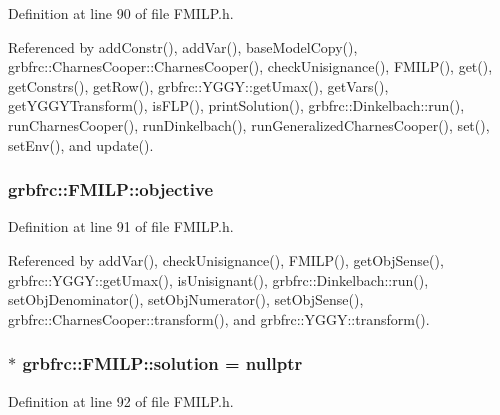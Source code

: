 Definition at line 90 of file F\+M\+I\+L\+P.\+h.



Referenced by add\+Constr(), add\+Var(), base\+Model\+Copy(), grbfrc\+::\+Charnes\+Cooper\+::\+Charnes\+Cooper(), check\+Unisignance(), F\+M\+I\+L\+P(), get(), get\+Constrs(), get\+Row(), grbfrc\+::\+Y\+G\+G\+Y\+::get\+Umax(), get\+Vars(), get\+Y\+G\+G\+Y\+Transform(), is\+F\+L\+P(), print\+Solution(), grbfrc\+::\+Dinkelbach\+::run(), run\+Charnes\+Cooper(), run\+Dinkelbach(), run\+Generalized\+Charnes\+Cooper(), set(), set\+Env(), and update().

\subsubsection[{\texorpdfstring{objective}{objective}}]{ grbfrc\+::\+F\+M\+I\+L\+P\+::objective\hspace{0.3cm}{\ttfamily [private]}}\hypertarget{classgrbfrc_1_1FMILP_a8807cc16614684fd6053b44dcd65657c}{}\label{classgrbfrc_1_1FMILP_a8807cc16614684fd6053b44dcd65657c}


Definition at line 91 of file F\+M\+I\+L\+P.\+h.



Referenced by add\+Var(), check\+Unisignance(), F\+M\+I\+L\+P(), get\+Obj\+Sense(), grbfrc\+::\+Y\+G\+G\+Y\+::get\+Umax(), is\+Unisignant(), grbfrc\+::\+Dinkelbach\+::run(), set\+Obj\+Denominator(), set\+Obj\+Numerator(), set\+Obj\+Sense(), grbfrc\+::\+Charnes\+Cooper\+::transform(), and grbfrc\+::\+Y\+G\+G\+Y\+::transform().

\subsubsection[{\texorpdfstring{solution}{solution}}]{$\ast$ grbfrc\+::\+F\+M\+I\+L\+P\+::solution = nullptr\hspace{0.3cm}{\ttfamily [private]}}\hypertarget{classgrbfrc_1_1FMILP_ae7b20c4efb2d3a689d46a5b88329b207}{}\label{classgrbfrc_1_1FMILP_ae7b20c4efb2d3a689d46a5b88329b207}


Definition at line 92 of file F\+M\+I\+L\+P.\+h.



